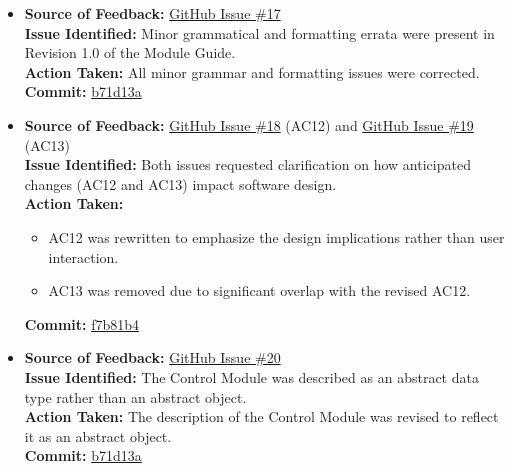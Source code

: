 \documentclass{article}
\begin{document}
\begin{itemize}

  \item \textbf{Source of Feedback:} \href{https://github.com/KiranSingh15/CAS-741-Image-Correspondences/issues/17}{GitHub Issue \#17} \\
  \textbf{Issue Identified:} Minor grammatical and formatting errata were present in Revision 1.0 of the Module Guide. \\
  \textbf{Action Taken:} All minor grammar and formatting issues were corrected. \\
  \textbf{Commit:} \href{https://github.com/KiranSingh15/CAS-741-Image-Correspondences/commit/b71d13a22a609f3a48efb7fa22a8fe5f681868c5}{b71d13a}

  \item \textbf{Source of Feedback:} 
    \href{https://github.com/KiranSingh15/CAS-741-Image-Correspondences/issues/18}{GitHub Issue \#18} (AC12) and 
    \href{https://github.com/KiranSingh15/CAS-741-Image-Correspondences/issues/19}{GitHub Issue \#19} (AC13) \\
  \textbf{Issue Identified:} Both issues requested clarification on how anticipated changes (AC12 and AC13) impact software design. \\
  \textbf{Action Taken:} 
  \begin{itemize}
    \item AC12 was rewritten to emphasize the design implications rather than user interaction.
    \item AC13 was removed due to significant overlap with the revised AC12.
  \end{itemize}
  \textbf{Commit:} \href{https://github.com/KiranSingh15/CAS-741-Image-Correspondences/commit/f7b81b48841c440ab665efb53fc0c8291c9c0e53}{f7b81b4}

  \item \textbf{Source of Feedback:} \href{https://github.com/KiranSingh15/CAS-741-Image-Correspondences/issues/20}{GitHub Issue \#20} \\
  \textbf{Issue Identified:} The Control Module was described as an abstract data type rather than an abstract object. \\
  \textbf{Action Taken:} The description of the Control Module was revised to reflect it as an abstract object. \\
  \textbf{Commit:} \href{https://github.com/KiranSingh15/CAS-741-Image-Correspondences/commit/b71d13a22a609f3a48efb7fa22a8fe5f681868c5}{b71d13a}


\end{itemize}
\end{document}
